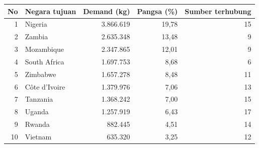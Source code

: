 \begin{tabular}{rlrrr}\toprule No & Negara tujuan & Demand (kg) & Pangsa (\%) & Sumber terhubung \\ \midrule
1 & Nigeria & 3.866.619 & 19,78 & 15 \\
2 & Zambia & 2.635.348 & 13,48 & 9 \\
3 & Mozambique & 2.347.865 & 12,01 & 9 \\
4 & South Africa & 1.697.753 & 8,68 & 6 \\
5 & Zimbabwe & 1.657.278 & 8,48 & 11 \\
6 & Côte d'Ivoire & 1.379.976 & 7,06 & 13 \\
7 & Tanzania & 1.368.242 & 7,00 & 15 \\
8 & Uganda & 1.257.919 & 6,43 & 17 \\
9 & Rwanda & 882.445 & 4,51 & 14 \\
10 & Vietnam & 635.320 & 3,25 & 12 \\
\bottomrule\end{tabular}
